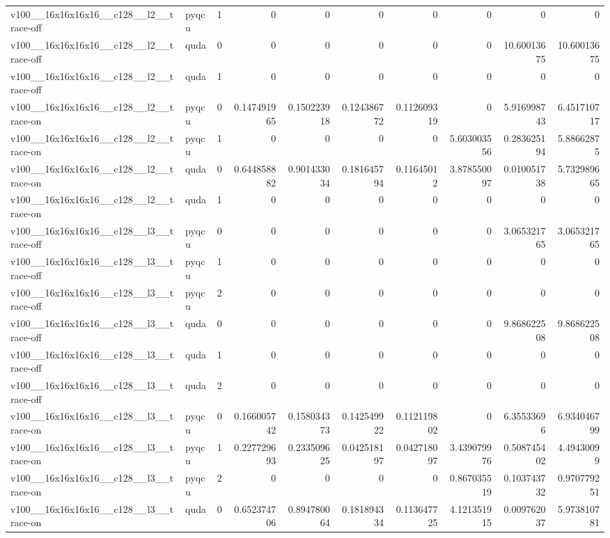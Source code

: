 \begin{table}[htbp]
\begin{tabular}{@{}llrrrrrrrr@{}}
v100\_\_16x16x16x16\_\_c128\_\_l2\_\_trace-off & pyqcu & 1 & 0 & 0 & 0 & 0 & 0 & 0 & 0 \\
v100\_\_16x16x16x16\_\_c128\_\_l2\_\_trace-off & quda & 0 & 0 & 0 & 0 & 0 & 0 & 10.60013675 & 10.60013675 \\
v100\_\_16x16x16x16\_\_c128\_\_l2\_\_trace-off & quda & 1 & 0 & 0 & 0 & 0 & 0 & 0 & 0 \\
v100\_\_16x16x16x16\_\_c128\_\_l2\_\_trace-on & pyqcu & 0 & 0.147491965 & 0.150223918 & 0.124386772 & 0.112609319 & 0 & 5.916998743 & 6.451710717 \\
v100\_\_16x16x16x16\_\_c128\_\_l2\_\_trace-on & pyqcu & 1 & 0 & 0 & 0 & 0 & 5.603003556 & 0.283625194 & 5.88662875 \\
v100\_\_16x16x16x16\_\_c128\_\_l2\_\_trace-on & quda & 0 & 0.644858882 & 0.901433034 & 0.181645794 & 0.11645012 & 3.878550097 & 0.010051738 & 5.732989665 \\
v100\_\_16x16x16x16\_\_c128\_\_l2\_\_trace-on & quda & 1 & 0 & 0 & 0 & 0 & 0 & 0 & 0 \\
v100\_\_16x16x16x16\_\_c128\_\_l3\_\_trace-off & pyqcu & 0 & 0 & 0 & 0 & 0 & 0 & 3.065321765 & 3.065321765 \\
v100\_\_16x16x16x16\_\_c128\_\_l3\_\_trace-off & pyqcu & 1 & 0 & 0 & 0 & 0 & 0 & 0 & 0 \\
v100\_\_16x16x16x16\_\_c128\_\_l3\_\_trace-off & pyqcu & 2 & 0 & 0 & 0 & 0 & 0 & 0 & 0 \\
v100\_\_16x16x16x16\_\_c128\_\_l3\_\_trace-off & quda & 0 & 0 & 0 & 0 & 0 & 0 & 9.868622508 & 9.868622508 \\
v100\_\_16x16x16x16\_\_c128\_\_l3\_\_trace-off & quda & 1 & 0 & 0 & 0 & 0 & 0 & 0 & 0 \\
v100\_\_16x16x16x16\_\_c128\_\_l3\_\_trace-off & quda & 2 & 0 & 0 & 0 & 0 & 0 & 0 & 0 \\
v100\_\_16x16x16x16\_\_c128\_\_l3\_\_trace-on & pyqcu & 0 & 0.166005742 & 0.158034373 & 0.142549922 & 0.112119802 & 0 & 6.35533696 & 6.934046799 \\
v100\_\_16x16x16x16\_\_c128\_\_l3\_\_trace-on & pyqcu & 1 & 0.227729693 & 0.233509625 & 0.042518197 & 0.042718097 & 3.439079976 & 0.508745402 & 4.49430099 \\
v100\_\_16x16x16x16\_\_c128\_\_l3\_\_trace-on & pyqcu & 2 & 0 & 0 & 0 & 0 & 0.867035519 & 0.103743732 & 0.970779251 \\
v100\_\_16x16x16x16\_\_c128\_\_l3\_\_trace-on & quda & 0 & 0.652374706 & 0.894780064 & 0.181894334 & 0.113647725 & 4.121351915 & 0.009762037 & 5.973810781 \\

\end{tabular}
\end{table}
